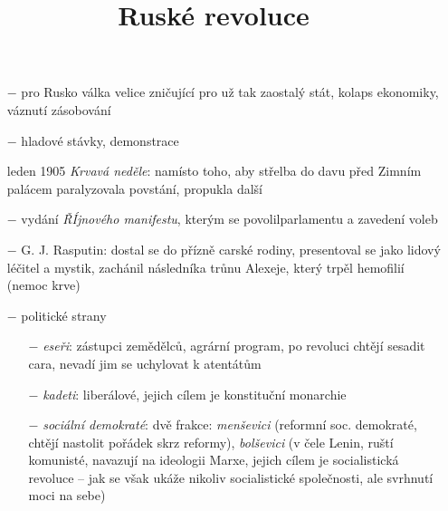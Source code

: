 \documentclass{article}
\title{\vspace{-2cm}Ruské revoluce\vspace{-1.7cm}}
\date{}
\author{}
\begin{document}
\maketitle

\begin{itemize}
    \vspace{-0.5em}
    \setlength\itemsep{0.15em}
    \item[$-$] pro Rusko válka velice zničující pro už tak zaostalý stát, kolaps ekonomiky, váznutí zásobování
    \item[$-$] hladové stávky, demonstrace
    \item[leden 1905] \textit{Krvavá neděle}: namísto toho, aby střelba do davu před Zimním palácem paralyzovala povstání, propukla další
    \item[$-$] vydání \textit{ŘÍjnového manifestu}, kterým se povolilparlamentu a zavedení voleb
    \item[$-$] G. J. Rasputin: dostal se do přízně carské rodiny, presentoval se jako lidový léčitel a mystik, zachánil následníka trůnu Alexeje, který trpěl hemofilií (nemoc krve)
    \item[$-$] politické strany
    \begin{itemize}
        \vspace{-0.5em}
        \setlength\itemsep{0.15em}
        \item[$-$] \textit{eseři}: zástupci zemědělců, agrární program, po revoluci chtějí sesadit cara, nevadí jim se uchylovat k atentátům
        \item[$-$] \textit{kadeti}: liberálové, jejich cílem je konstituční monarchie
        \item[$-$] \textit{sociální demokraté}: dvě frakce: \textit{menševici} (reformní soc. demokraté, chtějí nastolit pořádek skrz reformy), \textit{bolševici} (v čele Lenin, ruští komunisté, navazují na ideologii Marxe, jejich cílem je socialistická revoluce -- jak se však ukáže nikoliv socialistické společnosti, ale svrhnutí moci na sebe)
    \end{itemize}
\end{itemize}
\end{document}
